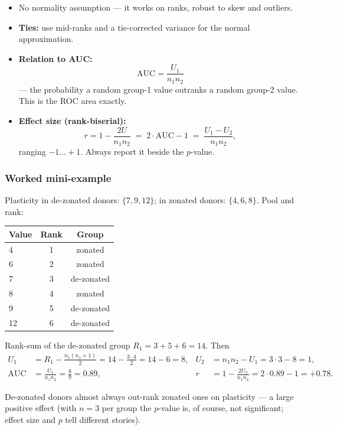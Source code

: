 \documentclass[11pt]{article}
\begin{document}
\begin{itemize}[leftmargin=*]
  \item No normality assumption --- it works on ranks, robust to skew and outliers.
  \item \textbf{Ties:} use mid-ranks and a tie-corrected variance for the normal approximation.
  \item \textbf{Relation to AUC:}
  \[
  \text{AUC} = \frac{U_1}{n_1 n_2}
  \]
  --- the probability a random group-1 value outranks a random group-2 value. This is the ROC area exactly.
  \item \textbf{Effect size (rank-biserial):}
  \[
  r = 1 - \frac{2U}{n_1 n_2} \;=\; 2\cdot\text{AUC} - 1 \;=\; \frac{U_1 - U_2}{n_1 n_2},
  \]
  ranging $-1\dots+1$. Always report it beside the $p$-value.
\end{itemize}

\subsubsection*{Worked mini-example}

Plasticity in de-zonated donors: $\{7, 9, 12\}$; in zonated donors: $\{4, 6, 8\}$. Pool and rank:

\begin{center}
\begin{tabular}{lcc}
\toprule
Value & Rank & Group \\
\midrule
4  & 1 & zonated \\
6  & 2 & zonated \\
7  & 3 & de-zonated \\
8  & 4 & zonated \\
9  & 5 & de-zonated \\
12 & 6 & de-zonated \\
\bottomrule
\end{tabular}
\end{center}

Rank-sum of the de-zonated group $R_1 = 3+5+6 = 14$. Then
\begin{align*}
U_1 &= R_1 - \frac{n_1(n_1+1)}{2} = 14 - \frac{3\cdot 4}{2} = 14 - 6 = 8,
      & U_2 &= n_1 n_2 - U_1 = 3\cdot 3 - 8 = 1, \\[0.4em]
\text{AUC} &= \frac{U_1}{n_1 n_2} = \frac{8}{9} = 0.89,
      & r &= 1 - \frac{2U_2}{n_1 n_2} = 2\cdot 0.89 - 1 = +0.78.
\end{align*}

De-zonated donors almost always out-rank zonated ones on plasticity --- a large positive effect (with $n=3$ per group the $p$-value is, of course, not significant; effect size and $p$ tell different stories).
\end{document}
